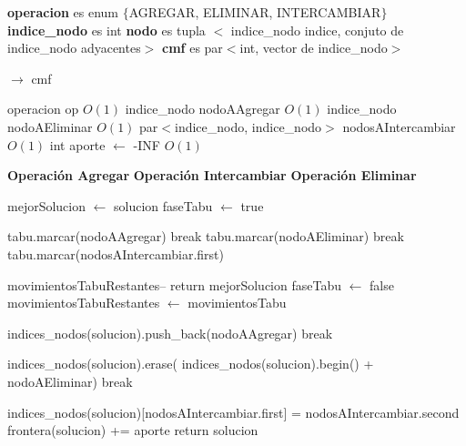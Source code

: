 \documentclass[a4paper, 10pt, twoside]{article}
\newenvironment{pseudo}[1][]{%
    \vspace{1em}%
    \begin{algorithmic}%
}
{%
    \end{algorithmic}%
    \vspace{1em}%
}
\newcommand{\Ode}[1]{\hfill $O(#1)$}
\begin{document}
\begin{pseudo}

\State \textbf{operacion} es enum $\lbrace$AGREGAR, ELIMINAR, INTERCAMBIAR$\rbrace$
\State \textbf{indice\_nodo} es int
\State \textbf{nodo} es tupla $<$ indice\_nodo indice, conjuto de indice\_nodo adyacentes$>$
\State \textbf{cmf} es par$<$int, vector de indice\_nodo$>$

\State
{} $\rightarrow$ cmf
	

	\State operacion op 																		\Ode{1}
	\State indice\_nodo nodoAAgregar															\Ode{1}
	\State indice\_nodo nodoAEliminar															\Ode{1}
	\State par$<$indice\_nodo, indice\_nodo$>$ nodosAIntercambiar								\Ode{1}
	\State int aporte $\leftarrow$ -INF															\Ode{1}

	\State
	\State \textbf{Operación Agregar}
	\State
	\State \textbf{Operación Intercambiar}
	\State
	\State \textbf{Operación Eliminar}
	\State


				\State mejorSolucion $\leftarrow$ solucion
				\State faseTabu $\leftarrow$ true
			\EndIf

				    \State tabu.marcar(nodoAAgregar)
				    \State break
				\EndCase
					\State  tabu.marcar(nodoAEliminar)
					\State break
				\EndCase
					\State tabu.marcar(nodosAIntercambiar.first)
				\EndCase
			\EndSwitch

			\State movimientosTabuRestantes--
			 return mejorSolucion
			\EndIf
		\Else
			faseTabu $\leftarrow$ false
			movimientosTabuRestantes $\leftarrow$ movimientosTabu
			\EndIf
		\EndIf


		    \State indices\_nodos(solucion).push\_back(nodoAAgregar)
		    \State break
	    \EndCase

		    \State indices\_nodos(solucion).erase(
		    \State indices\_nodos(solucion).begin() + nodoAEliminar)
		    \State break
	    \EndCase

		    \State indices\_nodos(solucion)[nodosAIntercambiar.first] = nodosAIntercambiar.second
	    \EndCase
	\EndSwitch
	\State
	\State frontera(solucion) += aporte
	\State return solucion


\end{pseudo}
\end{document}
